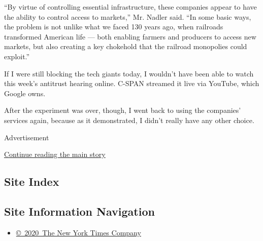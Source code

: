 ``By virtue of controlling essential infrastructure, these companies
appear to have the ability to control access to markets,'' Mr. Nadler
said. ``In some basic ways, the problem is not unlike what we faced 130
years ago, when railroads transformed American life --- both enabling
farmers and producers to access new markets, but also creating a key
chokehold that the railroad monopolies could exploit.''

If I were still blocking the tech giants today, I wouldn't have been
able to watch this week's antitrust hearing online. C-SPAN streamed it
live via YouTube, which Google owns.

After the experiment was over, though, I went back to using the
companies' services again, because as it demonstrated, I didn't really
have any other choice.

Advertisement

\protect\hyperlink{after-bottom}{Continue reading the main story}

\hypertarget{site-index}{%
\subsection{Site Index}\label{site-index}}

\hypertarget{site-information-navigation}{%
\subsection{Site Information
Navigation}\label{site-information-navigation}}

\begin{itemize}
\tightlist
\item
  \href{https://help.nytimes3xbfgragh.onion/hc/en-us/articles/115014792127-Copyright-notice}{©~2020~The
  New York Times Company}
\end{itemize}

